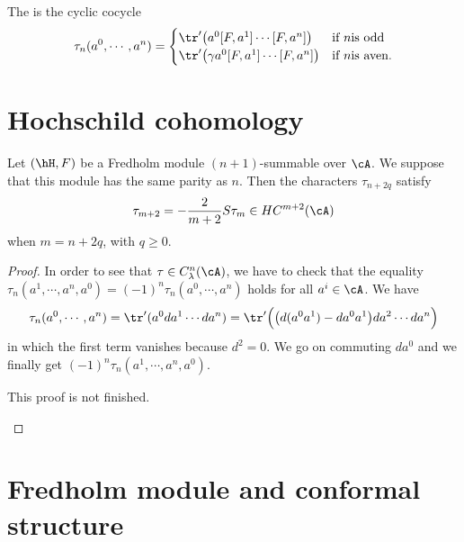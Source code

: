 The  is the cyclic cocycle
\begin{equation}
\tau_n(a^0,\cdots,a^{n})=
\begin{cases}
    \tr'\big( a^0[F,a^1]\cdots[F,a^{n}] \big)&\text{if }n \text{is odd}\\
    \tr'\big( \gamma a^0[F,a^1]\cdots[F,a^{n}] \big)&\text{if }n \text{is aven}.
\end{cases}
\end{equation}

\section{Hochschild cohomology}

\begin{proposition}
Let $(\hH,F)$ be a Fredholm module $(n+1)$-summable over $\cA$. We suppose that this module has the same parity as $n$. Then the characters $\tau_{n+2q}$ satisfy
\begin{equation}
\tau_{m+2}=-\frac{ 2 }{ m+2 }S\tau_m\in HC^{m+2}(\cA)
\end{equation}
when $m=n+2q$, with $q\geq 0$.
\end{proposition}

\begin{proof}
In order to see that $\tau\in C^n_{\lambda}(\cA)$, we have to check that the equality $\tau_n(a^1,\cdots,a^{n},a^0)=(-1)^n\tau_n(a^0,\cdots,a^{n})$ holds for all $a^i\in\cA$. We have
\[
\tau_n(a^0,\cdots,a^{n})=\tr'(a^0da^1\cdots da^{n})=\tr'\Big( \big( d(a^0a^1)-da^0a^1 \big)da^2\cdots da^{n} \Big)
\]
in which the first term vanishes because $d^2=0$. We go on commuting $da^0$ and we finally get $(-1)^n\tau_n(a^1,\cdots,a^n,a^0)$.

\begin{probleme}
	This proof is not finished.
\end{probleme}

\end{proof}
\section{Fredholm module and conformal structure}

